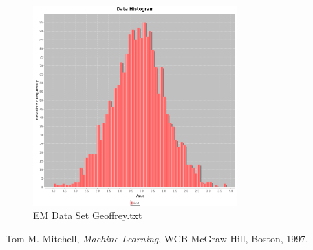 \documentclass{article}
\begin{document}
\begin{figure}
\centering
\includegraphics[width=0.7\textwidth]{em-data.png}
\caption{EM Data Set Geoffrey.txt}
\label{fig2}
\end{figure}


\begin{thebibliography}{9}

  Tom M. Mitchell,
  \emph{Machine Learning},
  WCB McGraw-Hill, Boston,
  1997.

\end{thebibliography}
\end{document}
